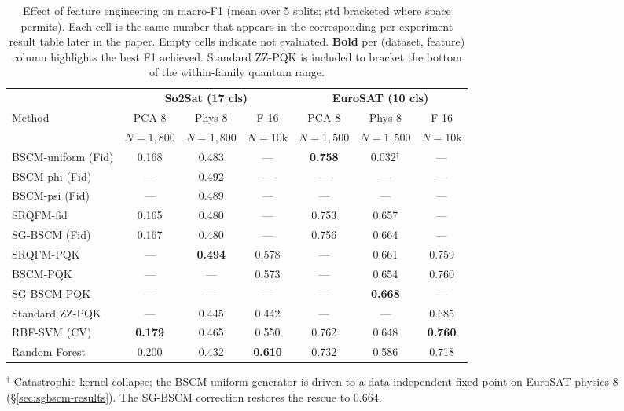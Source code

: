 \documentclass[pdflatex,sn-mathphys-num]{sn-jnl}
\theoremstyle{thmstyleone}
\theoremstyle{thmstyletwo}
\theoremstyle{thmstylethree}
\begin{document}
\begin{table}[htbp]
\caption{Effect of feature engineering on macro-F1 (mean over 5
splits; std bracketed where space permits). Each cell is the same
number that appears in the corresponding per-experiment result
table later in the paper. Empty cells indicate not evaluated.
\textbf{Bold} per (dataset, feature) column highlights the best F1
achieved.  Standard ZZ-PQK is included to bracket the bottom of the
within-family quantum range.}
\label{tab:feature-effect}
\begin{tabular}{l@{\hskip4pt}c@{\hskip4pt}c@{\hskip4pt}c@{\hskip6pt}c@{\hskip4pt}c@{\hskip4pt}c}
\toprule
& \multicolumn{3}{c}{\textbf{So2Sat (17 cls)}}
& \multicolumn{3}{c}{\textbf{EuroSAT (10 cls)}} \\
\cmidrule(lr){2-4} \cmidrule(lr){5-7}
Method & PCA-8 & Phys-8 & F-16 & PCA-8 & Phys-8 & F-16 \\
       & $N\!=\!1{,}800$ & $N\!=\!1{,}800$ & $N\!=\!10\text{k}$
       & $N\!=\!1{,}500$ & $N\!=\!1{,}500$ & $N\!=\!10\text{k}$ \\
\midrule
BSCM-uniform (Fid) & 0.168 & 0.483 & --- & \textbf{0.758} & 0.032$^\dagger$ & --- \\
BSCM-phi (Fid)     & ---   & 0.492 & --- & ---   & ---   & --- \\
BSCM-psi (Fid)     & ---   & 0.489 & --- & ---   & ---   & --- \\
SRQFM-fid          & 0.165 & 0.480 & --- & 0.753 & 0.657 & --- \\
SG-BSCM (Fid)      & 0.167 & 0.480 & --- & 0.756 & 0.664 & --- \\
SRQFM-PQK          & ---   & \textbf{0.494} & 0.578 & ---   & 0.661 & 0.759 \\
BSCM-PQK           & ---   & ---   & 0.573 & ---   & 0.654 & 0.760 \\
SG-BSCM-PQK        & ---   & ---   & --- & ---   & \textbf{0.668} & --- \\
Standard ZZ-PQK    & ---   & 0.445 & 0.442 & ---   & ---   & 0.685 \\
\midrule
RBF-SVM (CV)       & \textbf{0.179} & 0.465 & 0.550 & 0.762 & 0.648 & \textbf{0.760} \\
Random Forest      & 0.200 & 0.432 & \textbf{0.610} & 0.732 & 0.586 & 0.718 \\
\bottomrule
\end{tabular}

{\footnotesize $^\dagger$ Catastrophic kernel collapse; the
BSCM-uniform generator is driven to a data-independent fixed point on
EuroSAT physics-8 (\S\ref{sec:sgbscm-results}). The SG-BSCM correction
restores the rescue to $0.664$.}
\end{table}
\end{document}
